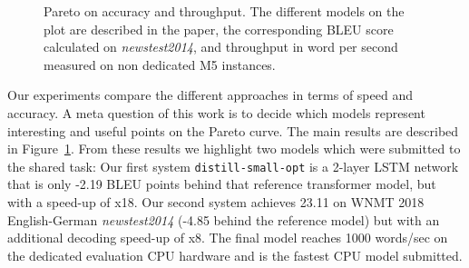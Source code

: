 \documentclass[11pt,a4paper]{article}
\begin{document}
\begin{figure}
\caption{Pareto on accuracy and throughput. The different models on the plot are described in the paper, the corresponding BLEU score calculated on {\it newstest2014}, and throughput in word per second measured on non dedicated M5 instances.}
\label{fig:pareto}
\end{figure}

Our experiments compare the different approaches in terms of speed and
accuracy. A meta question of this work is to decide which models
represent interesting and useful points on the Pareto curve. The main
results are described in Figure~\ref{fig:pareto}.  From these results
we highlight two models which were submitted to the shared task: Our
first system {\tt distill-small-opt} is a 2-layer LSTM network that is only
-2.19 BLEU points behind that reference transformer model, but with a
speed-up of {x18}. Our second system achieves 23.11 on
WNMT 2018 English-German {\it newstest2014} (-4.85 behind the reference
model) but with an additional decoding speed-up of {x8}.
The final model reaches 1000 words/sec on the dedicated evaluation CPU hardware and is the fastest CPU model submitted.

\end{document}
